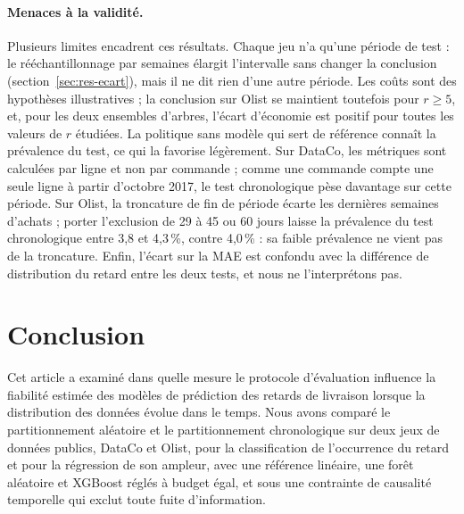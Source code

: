 \documentclass[11pt,a4paper]{article}
\theoremstyle{definition}
\begin{document}
\paragraph{Menaces à la validité.} Plusieurs limites encadrent ces résultats. Chaque jeu n'a qu'une période de test : le rééchantillonnage par semaines élargit l'intervalle sans changer la conclusion (section~\ref{sec:res-ecart}), mais il ne dit rien d'une autre période. Les coûts sont des hypothèses illustratives ; la conclusion sur Olist se maintient toutefois pour $r \ge 5$, et, pour les deux ensembles d'arbres, l'écart d'économie est positif pour toutes les valeurs de $r$ étudiées. La politique sans modèle qui sert de référence connaît la prévalence du test, ce qui la favorise légèrement. Sur DataCo, les métriques sont calculées par ligne et non par commande ; comme une commande compte une seule ligne à partir d'octobre 2017, le test chronologique pèse davantage sur cette période. Sur Olist, la troncature de fin de période écarte les dernières semaines d'achats ; porter l'exclusion de 29 à 45 ou 60 jours laisse la prévalence du test chronologique entre 3,8 et 4,3\,\%, contre 4,0\,\% : sa faible prévalence ne vient pas de la troncature. Enfin, l'écart sur la MAE est confondu avec la différence de distribution du retard entre les deux tests, et nous ne l'interprétons pas.

\section{Conclusion}
\label{sec:conclusion}

Cet article a examiné dans quelle mesure le protocole d'évaluation influence la fiabilité estimée des modèles de prédiction des retards de livraison lorsque la distribution des données évolue dans le temps. Nous avons comparé le partitionnement aléatoire et le partitionnement chronologique sur deux jeux de données publics, DataCo et Olist, pour la classification de l'occurrence du retard et pour la régression de son ampleur, avec une référence linéaire, une forêt aléatoire et XGBoost réglés à budget égal, et sous une contrainte de causalité temporelle qui exclut toute fuite d'information.
\end{document}

